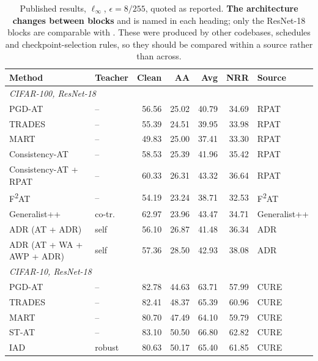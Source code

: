 \begin{table}[!htbp]
  \centering \small \setlength{\tabcolsep}{4.5pt}
  \caption{Published results, $\ell_\infty$, $\epsilon = 8/255$, quoted as reported. \textbf{The
  architecture changes between blocks} and is named in each heading; only the ResNet-18 blocks are
  comparable with . These were produced by other codebases, schedules and
  checkpoint-selection rules, so they should be compared within a source rather than across.}
  \label{tab:published}
  \begin{tabular}{llrrrrl}
    \toprule
    Method & Teacher & Clean & AA & Avg & NRR & Source \\
    \midrule
    \multicolumn{7}{l}{\emph{CIFAR-100, ResNet-18}} \\
    PGD-AT                    & --      & 56.56 & 25.02 & 40.79 & 34.69 & RPAT \\
    TRADES                    & --      & 55.39 & 24.51 & 39.95 & 33.98 & RPAT \\
    MART                      & --      & 49.83 & 25.00 & 37.41 & 33.30 & RPAT \\
    Consistency-AT            & --      & 58.53 & 25.39 & 41.96 & 35.42 & RPAT \\
    Consistency-AT + RPAT     & --      & 60.33 & 26.31 & 43.32 & 36.64 & RPAT \\
    F\textsuperscript{2}AT    & --      & 54.19 & 23.24 & 38.71 & 32.53 & F\textsuperscript{2}AT \\
    Generalist++              & co-tr.  & 62.97 & 23.96 & 43.47 & 34.71 & Generalist++ \\
    ADR (AT + ADR)            & self    & 56.10 & 26.87 & 41.48 & 36.34 & ADR \\
    ADR (AT + WA + AWP + ADR) & self    & 57.36 & 28.50 & 42.93 & 38.08 & ADR \\
    \midrule
    \multicolumn{7}{l}{\emph{CIFAR-10, ResNet-18}} \\
    PGD-AT                    & --      & 82.78 & 44.63 & 63.71 & 57.99 & CURE \\
    TRADES                    & --      & 82.41 & 48.37 & 65.39 & 60.96 & CURE \\
    MART                      & --      & 80.70 & 47.49 & 64.10 & 59.79 & CURE \\
    ST-AT                     & --      & 83.10 & 50.50 & 66.80 & 62.82 & CURE \\
    IAD                       & robust  & 80.63 & 50.17 & 65.40 & 61.85 & CURE \\

\end{tabular}
\end{table}
